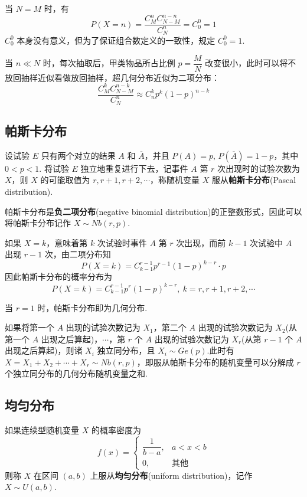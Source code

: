 \begin{note}
    \indent 当 $N=M$ 时，有
    $$
    P(X=n) = \dfrac{C_M^n C_{N-M}^{n-n}}{C_N^n} = C_0^0 = 1
    $$
    $C_0^0$ 本身没有意义，但为了保证组合数定义的一致性，规定 $C_0^0 = 1$.
\end{note}

当 $n \ll N$ 时，每次抽取后，甲类物品所占比例 $p = \dfrac{M}{N}$ 改变很小，此时可以将不放回抽样近似看做放回抽样，超几何分布近似为二项分布：
$$
\dfrac{C_M^k C_{N-M}^{n-k}}{C_N^n} \approx C_n^k p^k (1-p)^{n-k}
$$

\subsection{帕斯卡分布}

设试验 $E$ 只有两个对立的结果 $A$ 和 $\overline{A}$，并且 $P(A)=p, \, P(\overline{A})=1-p$，其中 $0<p<1$. 将试验 $E$ 独立地重复进行下去，记事件 $A$ 第 $r$ 次出现时的试验次数为 $X$，则 $X$ 的可能取值为 $r, r+1, r+2, \cdots$，称随机变量 $X$ 服从\textbf{帕斯卡分布}(Pascal distribution).

帕斯卡分布是\textbf{负二项分布}(negative binomial distribution)的正整数形式，因此可以将帕斯卡分布记作 $X \sim Nb(r,p)$.

如果 $X=k$，意味着第 $k$ 次试验时事件 $A$ 第 $r$ 次出现，而前 $k-1$ 次试验中 $A$ 出现 $r-1$ 次，由二项分布知
$$
P(X=k) = C_{k-1}^{r-1} p^{r-1} (1-p)^{k-r} \cdot p
$$
因此帕斯卡分布的概率分布为
$$
P(X=k) = C_{k-1}^{r-1} p^r (1-p)^{k-r},\ k = r, r+1, r+2, \cdots
$$

当 $r=1$ 时，帕斯卡分布即为几何分布.

如果将第一个 $A$ 出现的试验次数记为 $X_1$，第二个 $A$ 出现的试验次数记为 $X_2$(从第一个 $A$ 出现之后算起)，$\cdots$，第 $r$ 个 $A$ 出现的试验次数记为 $X_r$(从第 $r-1$ 个 $A$ 出现之后算起)，则诸 $X_i$ 独立同分布，且 $X_i \sim Ge(p)$.此时有 $X = X_1 + X_2 + \cdots + X_r \sim Nb(r,p)$，即服从帕斯卡分布的随机变量可以分解成 $r$ 个独立同分布的几何分布随机变量之和.

\subsection{均匀分布}

\begin{definition}
    \indent 如果连续型随机变量 $X$ 的概率密度为
    $$
    f(x)=\begin{cases}
        \dfrac{1}{b-a}, & a<x<b \\[0.5em]
        0, & \text{其他}
    \end{cases}
    $$
    则称 $X$ 在区间 $(a,b)$ 上服从\textbf{均匀分布}(uniform distribution)，记作 $X \sim U(a,b)$.
\end{definition}

